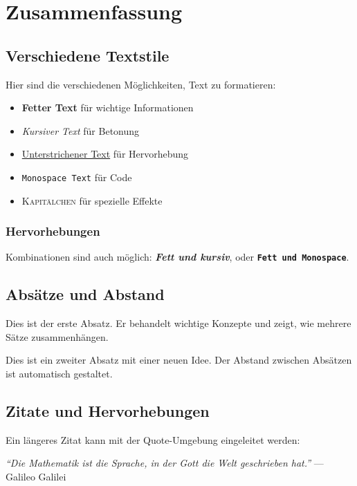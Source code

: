 \chapter{Zusammenfassung}

\section{Verschiedene Textstile}

Hier sind die verschiedenen Möglichkeiten, Text zu formatieren:

\begin{itemize}
    \item \textbf{Fetter Text} für wichtige Informationen
    \item \textit{Kursiver Text} für Betonung
    \item \underline{Unterstrichener Text} für Hervorhebung
    \item \texttt{Monospace Text} für Code
    \item \textsc{Kapitälchen} für spezielle Effekte
\end{itemize}

\subsection{Hervorhebungen}

Kombinationen sind auch möglich: \textbf{\textit{Fett und kursiv}}, oder \textbf{\texttt{Fett und Monospace}}.

\section{Absätze und Abstand}

Dies ist der erste Absatz. Er behandelt wichtige Konzepte und zeigt, wie mehrere Sätze zusammenhängen.

Dies ist ein zweiter Absatz mit einer neuen Idee. Der Abstand zwischen Absätzen ist automatisch gestaltet.

\section{Zitate und Hervorhebungen}

Ein längeres Zitat kann mit der Quote-Umgebung eingeleitet werden:

\textit{``Die Mathematik ist die Sprache, in der Gott die Welt geschrieben hat.''}
--- Galileo Galilei
